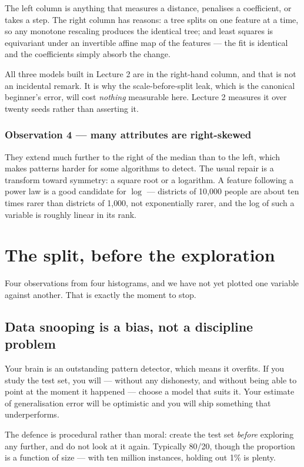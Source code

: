 \documentclass[11pt,a4paper]{article}
\begin{document}
The left column is anything that measures a distance, penalises a coefficient,
or takes a step. The right column has reasons: a tree splits on one feature at
a time, so any monotone rescaling produces the identical tree; and least
squares is equivariant under an invertible affine map of the features --- the
fit is identical and the coefficients simply absorb the change.

All three models built in Lecture 2 are in the right-hand column, and that is
not an incidental remark. It is why the scale-before-split leak, which is the
canonical beginner's error, will cost \emph{nothing} measurable here. Lecture 2
measures it over twenty seeds rather than asserting it.

\subsubsection{Observation 4 --- many attributes are right-skewed}

They extend much further to the right of the median than to the left, which
makes patterns harder for some algorithms to detect. The usual repair is a
transform toward symmetry: a square root or a logarithm. A feature following a
power law is a good candidate for $\log$ --- districts of 10{,}000 people are
about ten times rarer than districts of 1{,}000, not exponentially rarer, and
the log of such a variable is roughly linear in its rank.

\section{The split, before the exploration}\label{sec:split}

Four observations from four histograms, and we have not yet plotted one
variable against another. That is exactly the moment to stop.

\subsection{Data snooping is a bias, not a discipline problem}

Your brain is an outstanding pattern detector, which means it overfits. If you
study the test set, you will --- without any dishonesty, and without being able
to point at the moment it happened --- choose a model that suits it. Your
estimate of generalisation error will be optimistic and you will ship something
that underperforms.

The defence is procedural rather than moral: create the test set \emph{before}
exploring any further, and do not look at it again. Typically 80/20, though the
proportion is a function of size --- with ten million instances, holding out
1\% is plenty.
\end{document}
